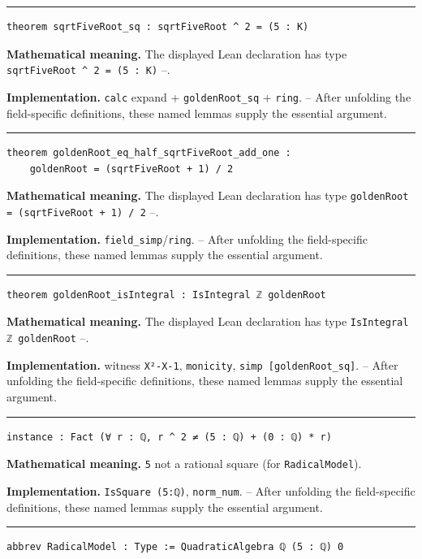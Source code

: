 \documentclass[UTF8,a4paper,11pt,fontset=fandol]{ctexart}
\theoremstyle{definition}
\newcommand{\statementsep}{\par\medskip\hrule\medskip}
\begin{document}
\statementsep
\begin{verbatim}
theorem sqrtFiveRoot_sq : sqrtFiveRoot ^ 2 = (5 : K)
\end{verbatim}
\noindent\textbf{Mathematical meaning.} The displayed Lean declaration has type \texttt{sqrtFiveRoot \textasciicircum{} 2 = (5 : K)} --.\par
\noindent\textbf{Implementation.} \texttt{calc} expand + \texttt{goldenRoot\_\allowbreak{}sq} + \texttt{ring}. -- After unfolding the field-specific definitions, these named lemmas supply the essential argument.\par
\statementsep
\begin{verbatim}
theorem goldenRoot_eq_half_sqrtFiveRoot_add_one :
    goldenRoot = (sqrtFiveRoot + 1) / 2
\end{verbatim}
\noindent\textbf{Mathematical meaning.} The displayed Lean declaration has type \texttt{goldenRoot = (sqrtFiveRoot + 1) /\allowbreak{} 2} --.\par
\noindent\textbf{Implementation.} \texttt{field\_\allowbreak{}simp}/\texttt{ring}. -- After unfolding the field-specific definitions, these named lemmas supply the essential argument.\par
\statementsep
\begin{verbatim}
theorem goldenRoot_isIntegral : IsIntegral ℤ goldenRoot
\end{verbatim}
\noindent\textbf{Mathematical meaning.} The displayed Lean declaration has type \texttt{IsIntegral ℤ goldenRoot} --.\par
\noindent\textbf{Implementation.} witness \texttt{X²-X-1}, \texttt{monicity}, \texttt{simp [goldenRoot\_\allowbreak{}sq]}. -- After unfolding the field-specific definitions, these named lemmas supply the essential argument.\par
\statementsep
\begin{verbatim}
instance : Fact (∀ r : ℚ, r ^ 2 ≠ (5 : ℚ) + (0 : ℚ) * r)
\end{verbatim}
\noindent\textbf{Mathematical meaning.} \texttt{5} not a rational square (for \texttt{RadicalModel}).\par
\noindent\textbf{Implementation.} \texttt{IsSquare (5:ℚ)}, \texttt{norm\_\allowbreak{}num}. -- After unfolding the field-specific definitions, these named lemmas supply the essential argument.\par
\statementsep
\begin{verbatim}
abbrev RadicalModel : Type := QuadraticAlgebra ℚ (5 : ℚ) 0
\end{verbatim}
\end{document}
